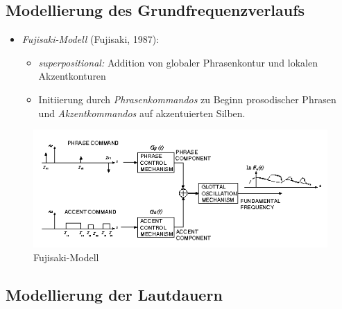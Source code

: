 \documentclass[11pt]{book}
\begin{document}
  \subsection*{Modellierung des Grundfrequenzverlaufs}

  \begin{itemize}
  \item \emph{Fujisaki-Modell} (Fujisaki, 1987):
  \begin{itemize}
  \item \emph{superpositional:} Addition von globaler Phrasenkontur und lokalen Akzentkonturen
  \item Initiierung durch \emph{Phrasenkommandos} zu Beginn prosodischer Phrasen und \emph{Akzentkommandos} auf akzentuierten Silben.
  \end{itemize}
  \end{itemize}
  
  \begin{figure}[htbp]
\begin{center}
  \includegraphics[width=\textwidth]{grafiken/sprachsynthese/fujisaki-pic.png}
  \caption{Fujisaki-Modell}
  \end{center}
  \end{figure}



  \subsection*{Modellierung der Lautdauern}
  
\end{document}
